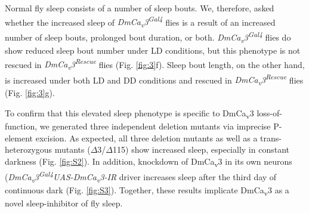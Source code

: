 Normal fly sleep consists of a number of sleep bouts.
We, therefore, asked whether the increased sleep of \emph{DmCa\textsubscript{v}3\textsuperscript{Gal4}} flies is a result of an increased number of sleep bouts, prolonged bout duration, or both.
\emph{DmCa\textsubscript{v}3\textsuperscript{Gal4}} flies do show reduced sleep bout number under LD conditions, but this phenotype is not rescued in \emph{DmCa\textsubscript{v}3\textsuperscript{Rescue}} flies (Fig. \ref{fig:3}f).
Sleep bout length, on the other hand, is increased under both LD and DD conditions and rescued in \emph{DmCa\textsubscript{v}3\textsuperscript{Rescue}} flies (Fig. \ref{fig:3}g).

To confirm that this elevated sleep phenotype is specific to DmCa\textsubscript{v}3 loss-of-function, we generated three independent deletion mutants via imprecise P-element excision.
As expected, all three deletion mutants as well as a trans-heterozygous mutants ($\Delta$3/$\Delta$115) show increased sleep, especially in constant darkness (Fig. \ref{fig:S2}).
In addition, knockdown of DmCa\textsubscript{v}3 in its own neurons (\emph{DmCa\textsubscript{v}3\textsuperscript{Gal4}\>UAS-DmCa\textsubscript{v}3-IR} driver increases sleep after the third day of continuous dark (Fig. \ref{fig:S3}).
Together, these results implicate DmCa\textsubscript{v}3 as a novel sleep-inhibitor of fly sleep.

  